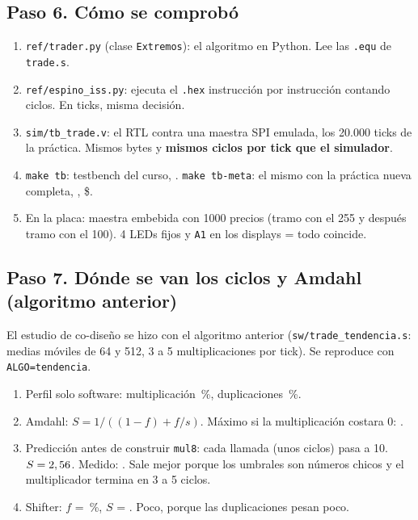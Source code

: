 \documentclass[11pt,letterpaper]{article}
\begin{document}
\subsection*{Paso 6. Cómo se comprobó}
\begin{enumerate}
\item \texttt{ref/trader.py} (clase \texttt{Extremos}): el algoritmo en Python. Lee las \texttt{.equ} de
  \texttt{trade.s}.
\item \texttt{ref/espino\_iss.py}: ejecuta el \texttt{.hex} instrucción por instrucción contando ciclos.
  En \ExtNTicks{} ticks, misma decisión.
\item \texttt{sim/tb\_trade.v}: el RTL contra una maestra SPI emulada, los 20.000 ticks de la práctica.
  Mismos bytes y \textbf{mismos ciclos por tick que el simulador}.
\item \texttt{make tb}: testbench del curso, \TbAprobados. \texttt{make tb-meta}: el mismo con la
  práctica nueva completa, \TbMetaAprobados, \$\TbMetaW.
\item En la placa: maestra embebida con 1000 precios (tramo con el 255 y después tramo con el 100). 4 LEDs
  fijos y \texttt{A1} en los displays = todo coincide.
\end{enumerate}

\subsection*{Paso 7. Dónde se van los ciclos y Amdahl (algoritmo anterior)}
El estudio de co-diseño se hizo con el algoritmo anterior (\texttt{sw/trade\_tendencia.s}: medias
móviles de 64 y 512, 3 a 5 multiplicaciones por tick). Se reproduce con \texttt{ALGO=tendencia}.
\begin{enumerate}
\item Perfil solo software: multiplicación \FracMul\,\%, duplicaciones \FracDup\,\%.
\item Amdahl: $S = 1/((1-f) + f/s)$. Máximo si la multiplicación costara 0: \AmdahlMaxMul.
\item Predicción antes de construir \texttt{mul8}: cada llamada (unos \CiclosMulSw{} ciclos) pasa a 10.
  $S = 2,56$. Medido: \AmdahlMedMul. Sale mejor porque los umbrales son números chicos y el
  multiplicador termina en 3 a 5 ciclos.
\item Shifter: $f$ = \AmdahlFShift\,\%, $S$ = \AmdahlMedShift. Poco, porque las duplicaciones pesan poco.
\end{enumerate}
\end{document}
